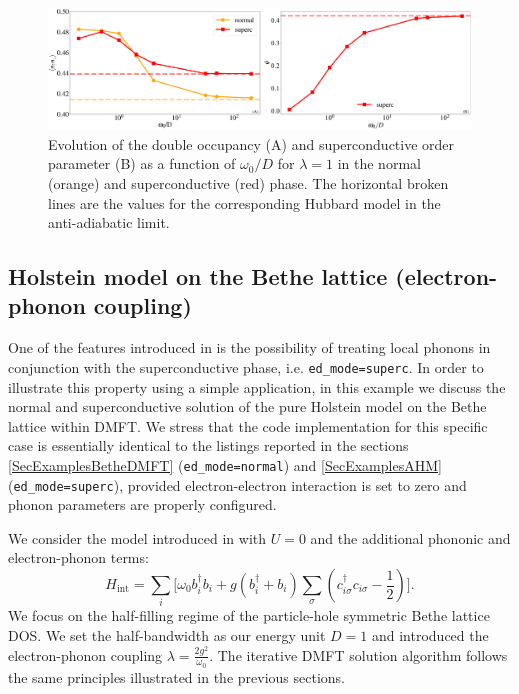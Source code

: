\documentclass[edipack_sp.tex]{subfiles}
\begin{document}
\begin{figure}[ht!]
    \includegraphics[width=\linewidth]{figures/figBethe_Holstein.pdf}
    \caption{\label{figEx5}
      Evolution of the double occupancy (A) and superconductive order parameter (B) as a function of $\omega_0/D$ for $\lambda=1$ in the normal (orange) and superconductive (red) phase. The horizontal broken lines are the values for the corresponding Hubbard model in the anti-adiabatic limit.}
\end{figure}

\subsection{Holstein model on the Bethe lattice (electron-phonon coupling)}

One of the features introduced in \NAME is the possibility of treating local phonons in conjunction with the superconductive phase,
i.e. {\tt ed\_mode=superc}. In order to illustrate this property using a simple application, in this example we discuss the normal and
superconductive solution of the pure Holstein model on the Bethe lattice within DMFT.
We stress that  the code
implementation for this specific case is essentially identical to the listings reported in the sections
\ref{SecExamplesBetheDMFT} ({\tt ed\_mode=normal}) and
\ref{SecExamplesAHM} ({\tt ed\_mode=superc}), provided electron-electron interaction is set to zero and phonon parameters are properly configured.  

We consider the model introduced in 
with $U=0$ and the additional phononic and electron-phonon terms:
\begin{equation} \label{eqex:H_Holstein}
    H_\mathrm{int} = \sum_i \Big[\omega_0 b^\dagger_i b_i + g(b^\dagger_i +
    b_i)\sum_{\sigma}\left(c^\dagger_{i\sigma}c_{i\sigma}
    -\frac{1}{2}\right)\Big]. 
\end{equation}
We focus on the half-filling regime of the particle-hole symmetric Bethe lattice DOS. We set the half-bandwidth as our energy unit $D=1$ and introduced the electron-phonon coupling $\lambda = \tfrac{2g^2}{\omega_0}$.  
The iterative DMFT solution algorithm follows the same principles illustrated in the previous sections. 
\end{document}
